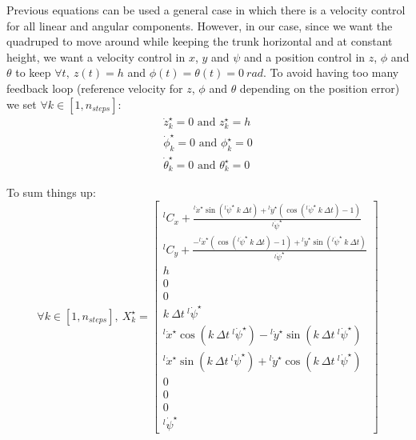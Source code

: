 \documentclass[a4paper,11pt]{article}
\begin{document}

Previous equations can be used a general case in which there is a velocity control for all linear and angular components. However, in our case, since we want the quadruped to move around while keeping the trunk horizontal and at constant height, we want a velocity control in $x$, $y$ and $\psi$ and a position control in $z$, $\phi$ and $\theta$ to keep $\forall t, ~z(t) = h$ and $\phi(t) = \theta(t) = 0~rad$. To avoid having too many feedback loop (reference velocity for $z$, $\phi$ and $\theta$ depending on the position error) we set $\forall k \in [1, n_{steps}]$:
\begin{align}
\dot z_k^\star = 0 \text{ and } z_k^\star = h \\
\dot \phi_k^\star = 0 \text{ and }  \phi_k^\star = 0 \\
\dot \theta_k^\star = 0 \text{ and }  \theta_k^\star = 0
\end{align}

To sum things up:
\begin{equation}
	\forall k \in [1, n_{steps}], ~ X_k^\star = \begin{bmatrix}
	{}^l\! C_x + \frac{{}^l\!\dot x^\star \sin({}^l\!\dot \psi^\star ~ k ~ \Delta t) + {}^l\!\dot y^\star \left( \cos({}^l\!\dot \psi^\star ~ k ~ \Delta t) - 1 \right)}{{}^l\!\dot \psi^\star} \\
	{}^l\! C_y + \frac{- {}^l\!\dot x^\star \left( \cos({}^l\!\dot \psi^\star ~ k ~ \Delta t) - 1 \right) + {}^l\!\dot y^\star \sin({}^l\!\dot \psi^\star ~ k ~ \Delta t)}{{}^l\!\dot \psi^\star} \\
	h \\ 0 \\ 0 \\ k ~ \Delta t ~  {}^l\! \dot \psi^\star \\
	{}^l\! \dot x^\star \cos(k ~ \Delta t ~  {}^l\! \dot \psi^\star) - {}^l\! \dot y^\star \sin(k ~ \Delta t ~  {}^l\! \dot \psi^\star) \\
	{}^l\! \dot x^\star \sin(k ~ \Delta t ~  {}^l\! \dot \psi^\star) + {}^l\! \dot y^\star \cos(k ~ \Delta t ~  {}^l\! \dot \psi^\star) \\ 0 \\ 0 \\ 0 \\ {}^l\! \dot \psi^\star
	\end{bmatrix}
\end{equation}
\end{document}
